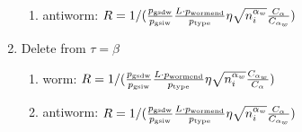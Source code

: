 \documentclass[12pt, two sided]{article}
\begin{document}
\begin{enumerate}
\begin{enumerate}
		\item{antiworm: $R = 1/(\frac{p_{\rm{gsdw}}}{p_{\rm{gsiw}}} \frac{L \cdot p_{\rm{wormend}}}{p_{\rm{type}}} \eta \sqrt{n_i^{\alpha_w}} \frac{C_{\alpha}}{C_{\alpha_w}})$}
		\end{enumerate}
		\item Delete from $\tau=\beta$ 
		\begin{enumerate}
		\item{worm: $R =  1/(\frac{p_{\rm{gsdw}}}{p_{\rm{gsiw}}} \frac{L \cdot p_{\rm{wormend}}}{p_{\rm{type}}} \eta \sqrt{n_i^{\alpha_w}} \frac{C_{\alpha_w}}{C_{\alpha}})$}
		\item{antiworm: $R =  1/(\frac{p_{\rm{gsdw}}}{p_{\rm{gsiw}}} \frac{L \cdot p_{\rm{wormend}}}{p_{\rm{type}}} \eta \sqrt{n_i^{\alpha_w}} \frac{C_{\alpha}}{C_{\alpha_w}})$}
		\end{enumerate}
	\end{enumerate}

{} 
 \singlespacing


\doublespacing
\end{document}
